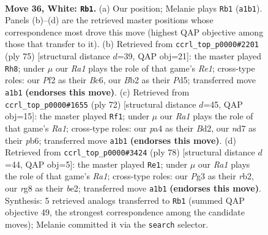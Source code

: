 \documentclass[11pt]{article}
\begin{document}
\clearpage

\begin{figure}[p]\centering
\begin{subfigure}{0.46\textwidth}\centering
\resizebox{\linewidth}{!}{%
\newchessgame
\chessboard[
  setfen={6r1/3n1k2/8/8/p1p1p3/P1P3Pp/1BP2P1P/R2K4 w - - 5 36},
  showmover=false,
  pgfstyle=straightmove, color=movearrow, markmove={a1-b1}
]}
\caption{}
\end{subfigure}\hfill
\begin{subfigure}{0.46\textwidth}\centering
\resizebox{\linewidth}{!}{%
\newchessgame
\chessboard[
  setfen={4r3/1p6/p1b1kpp1/3p4/3P1BP1/P4P2/P4K2/1R6 b - - 1 38},
  showmover=false,
  pgfstyle=straightmove, color=movearrow, markmove={e8-h8}
]}
\caption{}
\end{subfigure}
\\[4pt]
\begin{subfigure}{0.46\textwidth}\centering
\resizebox{\linewidth}{!}{%
\newchessgame
\chessboard[
  setfen={8/3kb1p1/ppr5/3p3p/P2P4/2PK2P1/3B3P/R7 w - - 4 37},
  showmover=false,
  pgfstyle=straightmove, color=movearrow, markmove={a1-f1}
]}
\caption{}
\end{subfigure}\hfill
\begin{subfigure}{0.46\textwidth}\centering
\resizebox{\linewidth}{!}{%
\newchessgame
\chessboard[
  setfen={8/5k2/8/p2p2pp/P2B4/2P2P2/1r2b1P1/R5K1 w - - 0 40},
  showmover=false,
  pgfstyle=straightmove, color=movearrow, markmove={a1-e1}
]}
\caption{}
\end{subfigure}
\caption{\textbf{Move 36, White: \texttt{Rb1}.} (a) Our position; Melanie plays \texttt{Rb1} (\texttt{a1b1}). Panels (b)--(d) are the retrieved master positions whose correspondence most drove this move (highest QAP objective among those that transfer to it). (b) Retrieved from \texttt{ccrl\_top\_p0000\#2201} (ply 75) [structural distance $d$=39, QAP obj=21]: the master played \texttt{Rh8}; under $\mu$ our \emph{Ra1} plays the role of that game's \emph{Re1}; cross-type roles: our \emph{P}f2 as their \emph{B}c6, our \emph{B}b2 as their \emph{P}d5; transferred move \texttt{a1b1} \textbf{(endorses this move)}. (c) Retrieved from \texttt{ccrl\_top\_p0000\#1655} (ply 72) [structural distance $d$=45, QAP obj=15]: the master played \texttt{Rf1}; under $\mu$ our \emph{Ra1} plays the role of that game's \emph{Ra1}; cross-type roles: our \emph{p}a4 as their \emph{B}d2, our \emph{n}d7 as their \emph{p}b6; transferred move \texttt{a1b1} \textbf{(endorses this move)}. (d) Retrieved from \texttt{ccrl\_top\_p0000\#3424} (ply 78) [structural distance $d$=44, QAP obj=5]: the master played \texttt{Re1}; under $\mu$ our \emph{Ra1} plays the role of that game's \emph{Ra1}; cross-type roles: our \emph{P}g3 as their \emph{r}b2, our \emph{r}g8 as their \emph{b}e2; transferred move \texttt{a1b1} \textbf{(endorses this move)}. Synthesis: 5 retrieved analogs transferred to \texttt{Rb1} (summed QAP objective 49, the strongest correspondence among the candidate moves); Melanie committed it via the \texttt{search} selector.}
\label{fig:thought-m70}
\end{figure}
\end{document}
